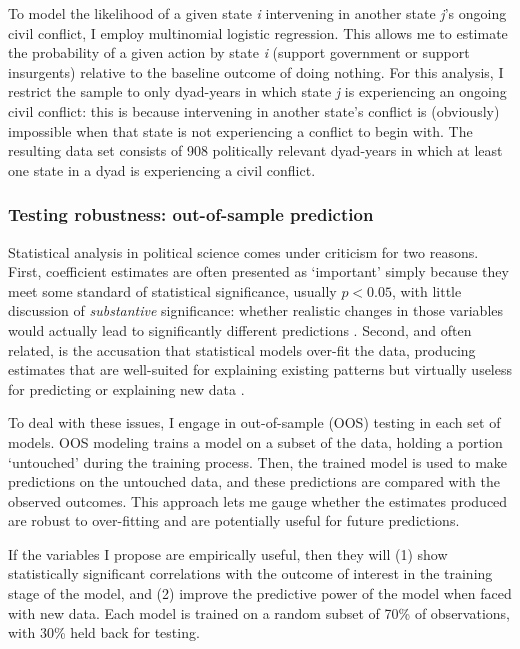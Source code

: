\documentclass[10pt,]{article}
\begin{document}
To model the likelihood of a given state \emph{i} intervening in another
state \emph{j}'s ongoing civil conflict, I employ multinomial logistic
regression. This allows me to estimate the probability of a given action
by state \emph{i} (support government or support insurgents) relative to
the baseline outcome of doing nothing. For this analysis, I restrict the
sample to only dyad-years in which state \emph{j} is experiencing an
ongoing civil conflict: this is because intervening in another state's
conflict is (obviously) impossible when that state is not experiencing a
conflict to begin with. The resulting data set consists of 908
politically relevant dyad-years in which at least one state in a dyad is
experiencing a civil conflict.

\subsubsection{Testing robustness: out-of-sample
prediction}\label{testing-robustness-out-of-sample-prediction}

Statistical analysis in political science comes under criticism for two
reasons. First, coefficient estimates are often presented as `important'
simply because they meet some standard of statistical significance,
usually \(p < 0.05\), with little discussion of \emph{substantive}
significance: whether realistic changes in those variables would
actually lead to significantly different predictions
\citep[2]{Head2015}. Second, and often related, is the accusation that
statistical models over-fit the data, producing estimates that are
well-suited for explaining existing patterns but virtually useless for
predicting or explaining new data \citep[597]{Ward2007}.

To deal with these issues, I engage in out-of-sample (OOS) testing in
each set of models. OOS modeling trains a model on a subset of the data,
holding a portion `untouched' during the training process. Then, the
trained model is used to make predictions on the untouched data, and
these predictions are compared with the observed outcomes. This approach
lets me gauge whether the estimates produced are robust to over-fitting
and are potentially useful for future predictions.

If the variables I propose are empirically useful, then they will (1)
show statistically significant correlations with the outcome of interest
in the training stage of the model, and (2) improve the predictive power
of the model when faced with new data. Each model is trained on a random
subset of 70\% of observations, with 30\% held back for testing.
\end{document}
